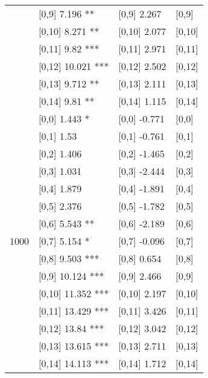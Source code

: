 \begin{table}
\begin{tabular}[t]{llll}
 & {}[0,9] 7.196 ** & {}[0,9] 2.267 & {}[0,9]\\
\addlinespace
 & {}[0,10] 8.271 ** & {}[0,10] 2.077 & {}[0,10]\\
 & {}[0,11] 9.82 *** & {}[0,11] 2.971 & {}[0,11]\\
 & {}[0,12] 10.021 *** & {}[0,12] 2.502 & {}[0,12]\\
 & {}[0,13] 9.712 ** & {}[0,13] 2.111 & {}[0,13]\\
 & {}[0,14] 9.81 ** & {}[0,14] 1.115 & {}[0,14]\\
\addlinespace
 & {}[0,0] 1.443 * & {}[0,0] -0.771 & {}[0,0]\\
 & {}[0,1] 1.53 & {}[0,1] -0.761 & {}[0,1]\\
 & {}[0,2] 1.406 & {}[0,2] -1.465 & {}[0,2]\\
 & {}[0,3] 1.031 & {}[0,3] -2.444 & {}[0,3]\\
 & {}[0,4] 1.879 & {}[0,4] -1.891 & {}[0,4]\\
\addlinespace
 & {}[0,5] 2.376 & {}[0,5] -1.782 & {}[0,5]\\
 & {}[0,6] 5.543 ** & {}[0,6] -2.189 & {}[0,6]\\
1000 & {}[0,7] 5.154 * & {}[0,7] -0.096 & {}[0,7]\\
 & {}[0,8] 9.503 *** & {}[0,8] 0.654 & {}[0,8]\\
 & {}[0,9] 10.124 *** & {}[0,9] 2.466 & {}[0,9]\\
\addlinespace
 & {}[0,10] 11.352 *** & {}[0,10] 2.197 & {}[0,10]\\
 & {}[0,11] 13.429 *** & {}[0,11] 3.426 & {}[0,11]\\
 & {}[0,12] 13.84 *** & {}[0,12] 3.042 & {}[0,12]\\
 & {}[0,13] 13.615 *** & {}[0,13] 2.711 & {}[0,13]\\
 & {}[0,14] 14.113 *** & {}[0,14] 1.712 & {}[0,14]\\
\bottomrule
\end{tabular}
\end{table}

